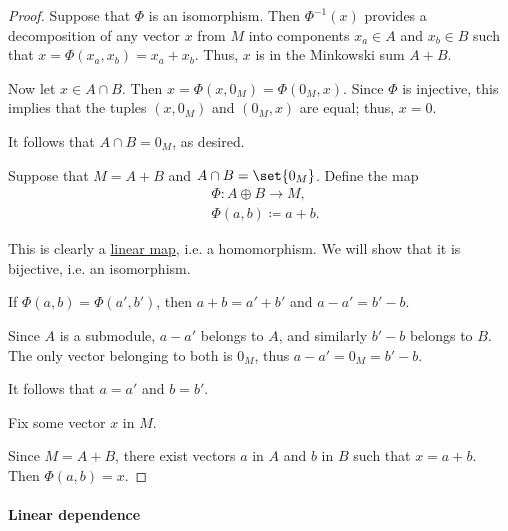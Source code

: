 \begin{proof}
  \SufficiencySubProof Suppose that \( \Phi \) is an isomorphism. Then \( \Phi^{-1}(x) \) provides a decomposition of any vector \( x \) from \( M \) into components \( x_a \in A \) and \( x_b \in B \) such that \( x = \Phi(x_a, x_b) = x_a + x_b \). Thus, \( x \) is in the Minkowski sum \( A + B \).

  Now let \( x \in A \cap B \). Then \( x = \Phi(x, 0_M) = \Phi(0_M, x) \). Since \( \Phi \) is injective, this implies that the tuples \( (x, 0_M) \) and \( (0_M, x) \) are equal; thus, \( x = 0 \).

  It follows that \( A \cap B = 0_M \), as desired.

  \NecessitySubProof Suppose that \( M = A + B \) and \( A \cap B = \set{ 0_M } \). Define the map
  \begin{equation*}
    \begin{aligned}
      &\Phi: A \oplus B \to M, \\
      &\Phi(a, b) \coloneqq a + b.
    \end{aligned}
  \end{equation*}

  This is clearly a \hyperref[def:linear_function]{linear map}, i.e. a homomorphism. We will show that it is bijective, i.e. an isomorphism.

   If \( \Phi(a, b) = \Phi(a', b') \), then \( a + b = a' + b' \) and \( a - a' = b' - b \).

  Since \( A \) is a submodule, \( a - a' \) belongs to \( A \), and similarly \( b' - b \) belongs to \( B \). The only vector belonging to both is \( 0_M \), thus \( a - a' = 0_M = b' - b \).

  It follows that \( a = a' \) and \( b = b' \).

   Fix some vector \( x \) in \( M \).

  Since \( M = A + B \), there exist vectors \( a \) in \( A \) and \( b \) in \( B \) such that \( x = a + b \). Then \( \Phi(a, b) = x \).
\end{proof}

\paragraph{Linear dependence}

